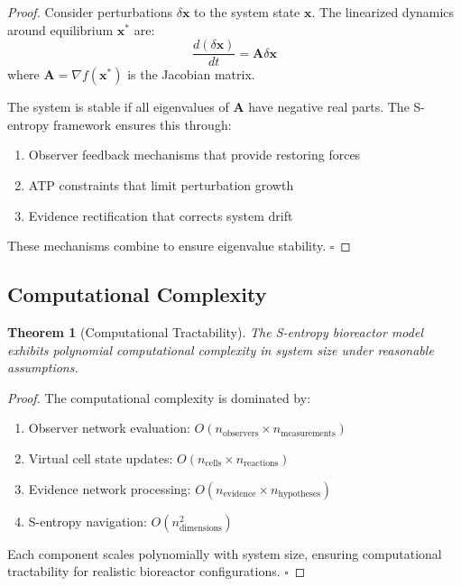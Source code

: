 \documentclass[12pt,a4paper]{article}
\newtheorem{theorem}{Theorem}
\begin{document}
\begin{proof}
Consider perturbations $\delta \mathbf{x}$ to the system state $\mathbf{x}$. The linearized dynamics around equilibrium $\mathbf{x}^*$ are:
\begin{equation}
\frac{d(\delta \mathbf{x})}{dt} = \mathbf{A} \delta \mathbf{x}
\end{equation}
where $\mathbf{A} = \nabla f(\mathbf{x}^*)$ is the Jacobian matrix.

The system is stable if all eigenvalues of $\mathbf{A}$ have negative real parts. The S-entropy framework ensures this through:
\begin{enumerate}
\item Observer feedback mechanisms that provide restoring forces
\item ATP constraints that limit perturbation growth
\item Evidence rectification that corrects system drift
\end{enumerate}

These mechanisms combine to ensure eigenvalue stability. $\square$
\end{proof}

\subsection{Computational Complexity}

\begin{theorem}[Computational Tractability]
The S-entropy bioreactor model exhibits polynomial computational complexity in system size under reasonable assumptions.
\end{theorem}

\begin{proof}
The computational complexity is dominated by:
\begin{enumerate}
\item Observer network evaluation: $O(n_{\text{observers}} \times n_{\text{measurements}})$
\item Virtual cell state updates: $O(n_{\text{cells}} \times n_{\text{reactions}})$
\item Evidence network processing: $O(n_{\text{evidence}} \times n_{\text{hypotheses}})$
\item S-entropy navigation: $O(n_{\text{dimensions}}^2)$
\end{enumerate}

Each component scales polynomially with system size, ensuring computational tractability for realistic bioreactor configurations. $\square$
\end{proof}
\end{document}
